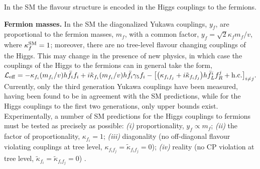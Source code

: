  In the SM the flavour structure is encoded in 
 the Higgs couplings to the fermions. 
 
\textbf{ Fermion masses.} In the SM the  
diagonalized Yukawa couplings, $y_f$, are
proportional to the fermion masses, $m_f$,  with a common
factor,  $y_f = \sqrt{2} \kappa_f m_f / v$, where  $\kappa_f^{\rm SM}=1$;
moreover,
there are no tree-level flavour changing couplings of the Higgs. This may change in the presence of new physics, in which case the couplings of the Higgs to the fermions can in general take the form, $\mathcal{L}_{\rm eff} = -\kappa_{f_i} (m_{f_i}/{v}) h \bar f_i f_i + i \tilde \kappa_{f_i} (m_{f_i}/v) h \bar f_i \gamma_5 f_i  
	- \big[\big( \kappa_{f_i f_j} + i \tilde \kappa_{f_i f_j} \big) h \bar f_L^i f_R^j +{\rm h.c.}\big]_{i\neq j}. $
	Currently, only the third generation Yukawa couplings have been measured, having been found to be in agreement with the SM predictions, while for the Higgs couplings to the first two generations, only upper bounds exist. 
Experimentally, a number of SM predictions for the Higgs couplings to fermions 
must be tested as precisely as possible: {\em (i)} proportionality, $y_f\propto m_f$; {\em (ii)} the factor of proportionality, $\kappa_{f_i}=1$; {\em (iii)} diagonality (no off-diagonal flavour violating couplings at tree level, $\kappa_{f_i f_j}=\tilde \kappa_{f_i f_j}= 0$); {\em (iv)} reality (no CP violation at tree level, $\tilde \kappa_{f_i}=\tilde \kappa_{f_i f_j}=0$) \cite{Nir:2016zkd}.

